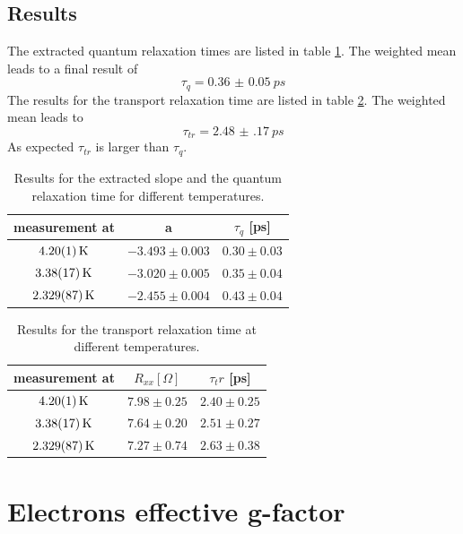\documentclass[12pt,a4paper]{article}
\begin{document}
\subsection{Results}

The extracted quantum relaxation times are listed in table \ref{tab:tau_q}. The weighted mean leads to a final result of
\begin{equation*}
\tau_q = \SI{0.36(5)}{ps}
\end{equation*}
The results for the transport relaxation time are listed in table \ref{tab:tau_tr}. The weighted mean leads to
\begin{equation*}
\tau_{tr} = \SI{2.48(17)}{ps}
\end{equation*}
As expected $\tau_{tr}$ is larger than $\tau_{q}$.

\begin{table}
\centering
\begin{tabular}{|c|c|c|}
\hline 
measurement at & a & $\tau_q$ [ps]\\ 
\hline 
$\SI{4.2 \pm 0.01}{K}$ & $-3.493 \pm 0.003$ & $0.30\pm 0.03$ \\ 
\hline
$\SI{3.38 \pm 0.17}{K}$ & $-3.020 \pm 0.005$ & $0.35\pm 0.04$ \\ 
\hline
$\SI{2.329 \pm 0.087}{K}$ & $-2.455 \pm 0.004$ & $0.43\pm 0.04$ \\ 
\hline
\end{tabular} 
\caption{Results for the extracted slope and the quantum relaxation time for different temperatures.}
\label{tab:tau_q}
\end{table}

\begin{table}
\centering
\begin{tabular}{|c|c|c|}
\hline 
measurement at & $R_{xx}[\Omega]$ & $\tau_tr$ [ps]\\ 
\hline 
$\SI{4.2 \pm 0.01}{K}$ & $7.98 \pm 0.25$ & $2.40\pm 0.25$ \\ 
\hline
$\SI{3.38 \pm 0.17}{K}$ & $7.64 \pm 0.20$ & $2.51\pm 0.27$ \\ 
\hline
$\SI{2.329 \pm 0.087}{K}$ & $7.27 \pm 0.74$ & $2.63\pm 0.38$ \\ 
\hline
\end{tabular} 
\caption{Results for the transport relaxation time at different temperatures.}
\label{tab:tau_tr}
\end{table}


\section{Electrons effective g-factor}
\end{document}
